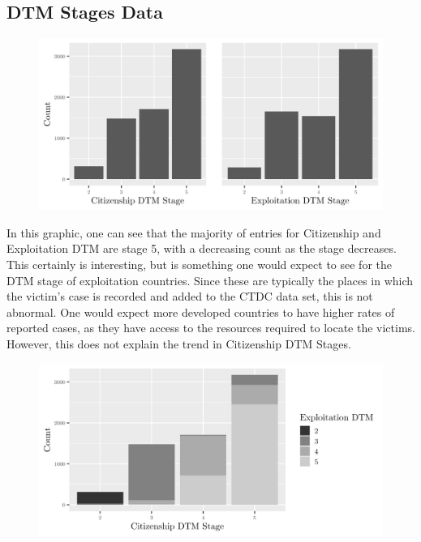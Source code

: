 \documentclass{article} %
\begin{document}
\subsection{DTM Stages Data}

\FloatBarrier
\begin{figure}[H]
	\includegraphics[width=\textwidth]{DTMStagesBarplot}
\end{figure}
\FloatBarrier

In this graphic, one can see that the majority of entries for Citizenship and Exploitation DTM are stage 5, with a decreasing count as the stage decreases. This certainly is interesting, but is something one would expect to see for the DTM stage of exploitation countries. Since these are typically the places in which the victim's case is recorded and added to the CTDC data set, this is not abnormal. One would expect more developed countries to have higher rates of reported cases, as they have access to the resources required to locate the victims. However, this does not explain the trend in Citizenship DTM Stages.
\FloatBarrier
\begin{figure}[H]
	\includegraphics[width = \textwidth]{DTMStage1}
\end{figure}
\FloatBarrier
\end{document}
